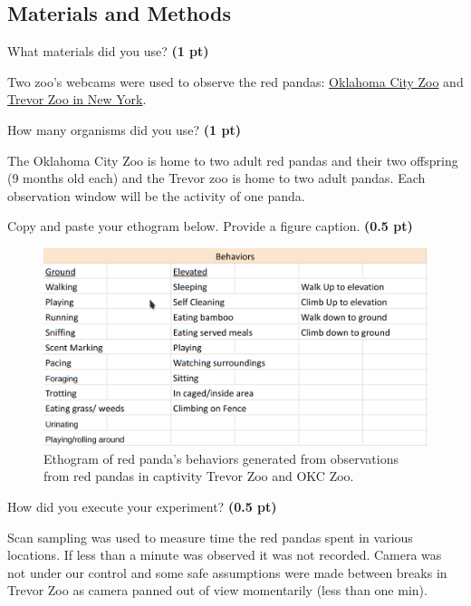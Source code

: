 \documentclass[12pt,a4paper]{article}
\begin{document}
\subsection*{Materials and Methods}

\begin{enumerate}[font=\bfseries, wide, resume]
    {\color{under}\item What materials did you use? \textbf{(1 pt)}}
    
    Two zoo's webcams were used to observe the red pandas: \href{https://www.youtube.com/watch?v=m3z2AZ5atjU}{Oklahoma City Zoo} and \href{https://www.youtube.com/watch?v=_5_oHPJDDOM}{Trevor Zoo in New York}.

    {\color{under}\item How many organisms did you use? \textbf{(1 pt)}}
    
    The Oklahoma City Zoo is home to two adult red pandas and their two offspring (9 months old each) and the Trevor zoo is home to two adult pandas. Each observation window will be the activity of one panda.
    
    {\color{under}\item  Copy and paste your ethogram below. Provide a figure caption. \textbf{(0.5 pt)}}

    \begin{figure}[h]
        \centering
        \includegraphics[width=\linewidth]{images/ectogram.png}
        \caption{Ethogram of red panda's behaviors generated from observations from red pandas in captivity Trevor Zoo and OKC Zoo.}
    \end{figure}
\newpage 

    {\color{under}\item How did you execute your experiment?  \textbf{(0.5 pt)}}

    Scan sampling was used to measure time the red pandas spent in various locations. If less than a minute was observed it was not recorded. Camera was not under our control and some safe assumptions were made between breaks in Trevor Zoo as camera panned out of view momentarily (less than one min). 


\end{enumerate}
\end{document}
